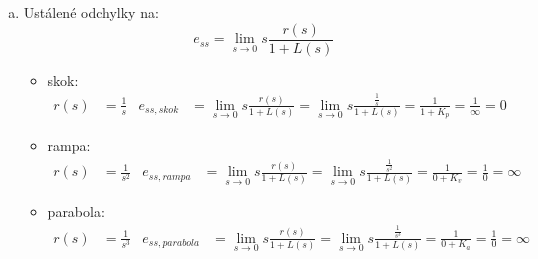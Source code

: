 \documentclass{article}
\begin{document}
\begin{enumerate}[a)]
    \newpage
    \item Ustálené odchylky na:
    \[e_{ss} = \lim_{s\rightarrow 0} s \frac{r(s)}{1+L(s)}\]
    \begin{itemize}
        \item skok:
        \begin{align*}
            r(s) &= \frac{1}{s} & e_{ss,skok} &= \lim_{s\rightarrow 0} s \frac{r(s)}{1+L(s)} = \lim_{s\rightarrow 0} s \frac{\frac{1}{s}}{1+L(s)} = \frac{1}{1+K_p} = \frac{1}{\infty} = 0
        \end{align*}

        \item rampa:
        \begin{align*}
            r(s) &= \frac{1}{s^2} & e_{ss,rampa} &= \lim_{s\rightarrow 0} s \frac{r(s)}{1+L(s)} = \lim_{s\rightarrow 0} s \frac{\frac{1}{s^2}}{1+L(s)} = \frac{1}{0+K_v} = \frac{1}{0} = \infty
        \end{align*}

        \item parabola:
        \begin{align*}
            r(s) &= \frac{1}{s^3} & e_{ss,parabola} &= \lim_{s\rightarrow 0} s \frac{r(s)}{1+L(s)} = \lim_{s\rightarrow 0} s \frac{\frac{1}{s^3}}{1+L(s)} = \frac{1}{0+K_a} = \frac{1}{0} = \infty
        \end{align*}
    \end{itemize}
\end{enumerate}
\end{document}
